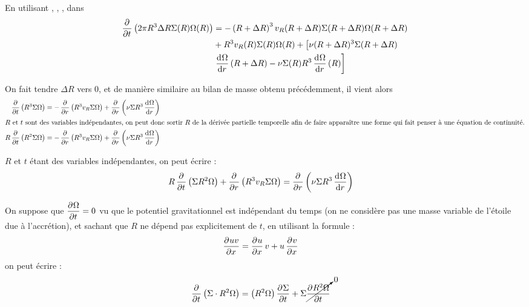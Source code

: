En utilisant , , , dans 
\begin{align*}
\begin{split}
\dpd{}{t}\left(2\pi R^3 \Delta R \Sigma(R)\Omega(R)\right) &= -\left(R+\Delta R\right)^3v_R(R+\Delta R) \Sigma(R+\Delta R) \Omega(R+\Delta R)\\
& + R^3 v_R(R) \Sigma(R) \Omega(R) + \left[\nu(R+\Delta R)^3\Sigma(R+\Delta R)\right.\\
&\left. \dod{\Omega}{r}(R+\Delta R)-\nu \Sigma(R) R^3 \dod{\Omega}{r}(R)\right]
\end{split}
\end{align*}



On fait tendre $\Delta R$ vers 0, et de manière similaire au bilan de masse obtenu précédemment, il vient alors 
\begin{align*}
\dpd{}{t}\left(R^3 \Sigma\Omega\right) &= -\dpd{}{r}\left(R^3 v_R \Sigma \Omega\right) + \dpd{}{r}\left(\nu \Sigma R^3 \dod{\Omega}{r}\right)\\
\intertext{$R$ et $t$ sont des variables indépendantes, on peut donc sortir $R$ de la dérivée partielle temporelle afin de faire apparaître une forme qui fait penser à une équation de continuité.}
R\dpd{}{t}\left(R^2 \Sigma\Omega\right) &= -\dpd{}{r}\left(R^3 v_R \Sigma \Omega\right) + \dpd{}{r}\left(\nu \Sigma R^3 \dod{\Omega}{r}\right)
\end{align*}

$R$ et $t$ étant des variables indépendantes, on peut écrire :
\begin{align}
R\dpd{}{t}\left(\Sigma R^2\Omega\right) + \dpd{}{r}\left(R^3 v_R \Sigma \Omega\right) &= \dpd{}{r}\left(\nu \Sigma R^3 \dod{\Omega}{r}\right)\label{eq:ang_mom_01}
\end{align}

\bigskip

On suppose que $\dpd{\Omega}{t}=0$ vu que le potentiel gravitationnel est indépendant du temps (on ne considère pas une masse variable de l'étoile due à l'accrétion), et sachant que $R$ ne dépend pas explicitement de $t$, en utilisant la formule : 
\begin{align*}
\dpd{uv}{x} &= \dpd{u}{x}v + u\dpd{v}{x}
\end{align*}
on peut écrire :
\begin{align}
\dpd{}{t}\left(\Sigma\cdot R^2\Omega\right) &= \left(R^2\Omega\right)\dpd{\Sigma}{t} + \Sigma\cancelto{0}{\dpd{R^2\Omega}{t}}\label{eq:ang_mom_tmp_01}
\end{align}

